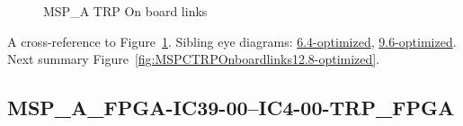 \begin{figure}[h]
\begin{subfigure}{0.25\textwidth}
\hyperref[sec:MSPAFPGAIC3924IC424TRPFPGA12.8-optimized]{}
\end{subfigure}\hspace*{\fill}
\begin{subfigure}{0.25\textwidth}
\hyperref[sec:MSPAFPGAIC3925IC425TRPFPGA12.8-optimized]{}
\end{subfigure}\hspace*{\fill}
\begin{subfigure}{0.25\textwidth}
\hyperref[sec:MSPAFPGAIC3926IC426TRPFPGA12.8-optimized]{}
\end{subfigure}\hspace*{\fill}
\begin{subfigure}{0.25\textwidth}
\hyperref[sec:MSPAFPGAIC3927IC427TRPFPGA12.8-optimized]{}
\end{subfigure}

\caption{MSP\_A TRP On board links} \label{fig:MSPATRPOnboardlinks12.8-optimized}
\end{figure}

A cross-reference to Figure~\ref{fig:MSPATRPOnboardlinks12.8-optimized}.
Sibling eye diagrams: \hyperref[sec:MSPATRPOnboardlinks6.4-optimized]{6.4-optimized}, \hyperref[sec:MSPATRPOnboardlinks9.6-optimized]{9.6-optimized}. \\
Next summary Figure~\ref{fig:MSPCTRPOnboardlinks12.8-optimized}.
\clearpage
% 
\subsection{MSP\_A\_FPGA-IC39-00--IC4-00-TRP\_FPGA}\label{sec:MSPAFPGAIC3900IC400TRPFPGA12.8-optimized}


